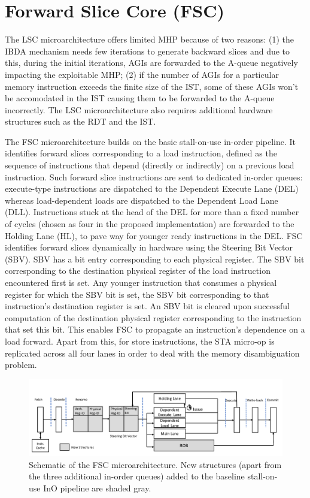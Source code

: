 \documentclass[a4paper,12pt, final]{report}
\begin{document}
\section{Forward Slice Core (FSC)}

The LSC microarchitecture offers limited MHP because of two reasons: (1) the IBDA mechanism needs few iterations to generate backward slices and due to this, during the initial iterations, AGIs are forwarded to the A-queue negatively impacting the exploitable MHP; (2) if the number of AGIs for a particular memory instruction exceeds the finite size of the IST, some of these AGIs won't be accomodated in the IST causing them to be forwarded to the A-queue incorrectly. The LSC microarchitecture also requires additional hardware structures such as the RDT and the IST.

The FSC microarchitecture builds on the basic stall-on-use in-order pipeline. It identifies forward slices corresponding to a load instruction, defined as the sequence of instructions that depend (directly or indirectly) on a previous load instruction. Such forward slice instructions are sent to dedicated in-order queues: execute-type instructions are dispatched to the Dependent Execute Lane (DEL) whereas load-dependent loads are dispatched to the Dependent Load Lane (DLL). Instructions stuck at the head of the DEL for more than a fixed number of cycles (chosen as four in the proposed implementation) are forwarded to the Holding Lane (HL), to pave way for younger ready instructions in the DEL. FSC identifies forward slices dynamically in hardware using the Steering Bit Vector (SBV). SBV has a bit entry corresponding to each physical register. The SBV bit corresponding to the destination physical register of the load instruction encountered first is set. Any younger instruction that consumes a physical register for which the SBV bit is set, the SBV bit corresponding to that instruction's destination register is set. An SBV bit is cleared upon successful computation of the destination physical register corresponding to the instruction that set this bit. This enables FSC to propagate an instruction's dependence on a load forward. Apart from this, for store instructions, the STA micro-op is replicated across all four lanes in order to deal with the memory disambiguation problem. 

\begin{figure}[H]
    \begin{center}
    \includegraphics[width=\linewidth]{august22/img/fsc.png}
    \caption{Schematic of the FSC microarchitecture. New structures (apart from the three additional in-order queues) added to the baseline stall-on-use InO pipeline are shaded gray.}
    \end{center}
\end{figure}
\end{document}

